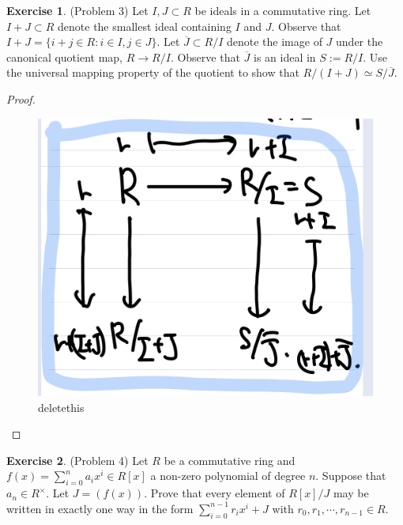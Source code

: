 \documentclass[12pt, psamsfonts]{amsart}
\theoremstyle{definition}
\newtheorem*{exer}{Exercise}
\theoremstyle{remark}
\numberwithin{equation}{section}
\begin{document}
\begin{exer}{(Problem 3)}
  Let $I, J \subset R$ be ideals in a commutative ring.
  Let $I + J \subset R$ denote the smallest ideal containing $I$ and $J$.
  Observe that $I + J = \{ i + j \in R : i \in I, j \in J \}$.
  Let $\overline{J} \subset R / I$ denote the image of $J$ under the canonical quotient map, $R \rightarrow R / I$.
  Observe that $\overline{J}$ is an ideal in $S := R / I$.
  Use the universal mapping property of the quotient to show that $R / (I + J) \simeq S / \overline{J}$.
\end{exer}

\begin{proof}
  \begin{figure}
    \includegraphics[width=.5\linewidth]{problem3_partial_delete.jpeg}
      \caption{deletethis}
    \label{fig:mydelete}
  \end{figure}
\end{proof}

\begin{exer}{(Problem 4)}
  Let $R$ be a commutative ring and $f(x) = \sum_{i=0}^{n} a_ix^i \in R[x]$ a non-zero polynomial of degree $n$.
  Suppose that $a_n \in R^{\times}$.
  Let $J = (f(x))$.
  Prove that every element of $R[x]/J$ may be written in exactly one way in the form $\sum_{i=0}^{n - 1}r_ix^i + J$ with $r_0, r_1, \cdots, r_{n - 1} \in R$.
\end{exer}
\end{document}
